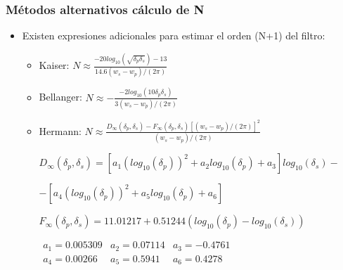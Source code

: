 \begin{frame}
\frametitle{Métodos alternativos cálculo de N}

\vspace{-0.4cm}

\footnotesize
\begin{itemize}
\item Existen expresiones  adicionales para estimar el orden (N+1) del filtro:

\begin{itemize}

\vspace{-0.1cm}

\footnotesize

\item Kaiser: $\displaystyle N \approx \frac{-20 log_{10}\left( \sqrt{\delta_p \delta_s}\right)-13}{14.6(w_s-w_p)/(2\pi)}$


\item Bellanger: $\displaystyle  N \approx - \frac{-2 log_{10}( 10 \delta_p \delta_s)}{3(w_s-w_p)/(2\pi)}$


\item Hermann: $\displaystyle  N \approx  \frac{D_\infty(\delta_p,\delta_s)-F_\infty(\delta_p,\delta_s)\left [(w_s-w_p)/(2\pi)\right ]^2}{(w_s-w_p)/(2\pi)}$

{\scriptsize
$D_\infty(\delta_p,\delta_s)=\left [a_1 \left (log_{10}(\delta_p)\right )^2+ a_2 log_{10}(\delta_p)+a_3\right ]log_{10}(\delta_s)-$

\hspace{1.8cm}$-\left [a_4 \left (log_{10}(\delta_p)\right )^2+ a_5 log_{10}(\delta_p)+a_6\right ]$

\vspace{0.1cm}

$F_\infty(\delta_p,\delta_s)=11.01217 + 0.51244 \left ( log_{10}(\delta_p)-log_{10}(\delta_s)\right )$

\vspace{0.1cm}


\hspace{-0.2cm}$\begin{array}{lll}a_1=0.005309 &a_2=0.07114 & a_3=-0.4761 \\ a_4=0.00266 &a_5=0.5941&a_6=0.4278\end{array}$

}



\end{itemize}
\end{itemize}
\end{frame}
